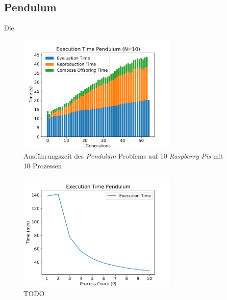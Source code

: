 \subsection{Pendulum}
Die %
\begin{figure}[!h]
	\centering
	\includegraphics[width=0.7\textwidth]{./img/pendulum_analysis/pendulum_time_1_10core_10pi.pdf} 
	\caption{Ausführungszeit des \emph{Pendulum} Problems auf 10 \emph{Raspberry Pis} mit 10 Prozessen}
	\label{fig:pendulum_10core_10pi}
\end{figure}

\begin{figure}[!h]
	\centering
	\includegraphics[width=0.7\textwidth]{./img/pendulum_analysis/pendulum_execution_1_1_10.pdf} 
	\caption{TODO}
	\label{fig:pendulum_10core_10pi}
\end{figure}

